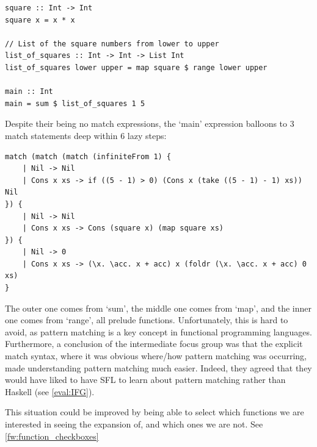 \begin{lstlisting}[language=SFL]
square :: Int -> Int
square x = x * x

// List of the square numbers from lower to upper
list_of_squares :: Int -> Int -> List Int
list_of_squares lower upper = map square $ range lower upper

main :: Int
main = sum $ list_of_squares 1 5
\end{lstlisting}

\noindent Despite their being no match expressions, the `main' expression balloons to 3 match statements deep within 6 lazy steps:

\begin{lstlisting}[language=SFL]
match (match (match (infiniteFrom 1) {
    | Nil -> Nil
    | Cons x xs -> if ((5 - 1) > 0) (Cons x (take ((5 - 1) - 1) xs)) Nil
}) {
    | Nil -> Nil
    | Cons x xs -> Cons (square x) (map square xs)
}) {
    | Nil -> 0
    | Cons x xs -> (\x. \acc. x + acc) x (foldr (\x. \acc. x + acc) 0 xs)
}
\end{lstlisting}

The outer one comes from `sum', the middle one comes from `map', and the inner one comes from `range', all prelude functions. Unfortunately, this is hard to avoid, as pattern matching is a key concept in functional programming languages. Furthermore, a conclusion of the intermediate focus group was that the explicit match syntax, where it was obvious where/how pattern matching was occurring, made understanding pattern matching much easier. Indeed, they agreed that they would have liked to have SFL to learn about pattern matching rather than Haskell (see \ref{eval:IFG}). 

This situation could be improved by being able to select which functions we are interested in seeing the expansion of, and which ones we are not. See \ref{fw:function_checkboxes}


